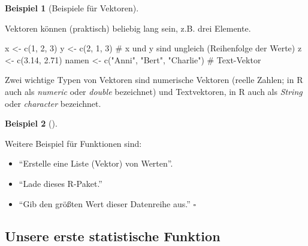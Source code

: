 \documentclass[
  letterpaper,
  twoside,
  open=any]{scrbook}
\newenvironment{Shaded}{\begin{snugshade}}{\end{snugshade}}
\newcommand{\CommentTok}[1]{\textcolor[rgb]{0.37,0.37,0.37}{#1}}
\newcommand{\DecValTok}[1]{\textcolor[rgb]{0.68,0.00,0.00}{#1}}
\newcommand{\FloatTok}[1]{\textcolor[rgb]{0.68,0.00,0.00}{#1}}
\newcommand{\FunctionTok}[1]{\textcolor[rgb]{0.28,0.35,0.67}{#1}}
\newcommand{\NormalTok}[1]{\textcolor[rgb]{0.00,0.23,0.31}{#1}}
\newcommand{\OtherTok}[1]{\textcolor[rgb]{0.00,0.23,0.31}{#1}}
\newcommand{\StringTok}[1]{\textcolor[rgb]{0.13,0.47,0.30}{#1}}
\providecommand{\tightlist}{%
  \setlength{\itemsep}{0pt}\setlength{\parskip}{0pt}}\usepackage{longtable,booktabs,array}
\theoremstyle{definition}
\theoremstyle{definition}
\newtheorem{example}{Beispiel}[chapter]
\theoremstyle{definition}
\theoremstyle{remark}
\begin{document}
\begin{example}[Beispiele für
Vektoren]\protect\hypertarget{exm-vektoren}{}\label{exm-vektoren}

Vektoren können (praktisch) beliebig lang sein, z.B. drei Elemente.

\begin{Shaded}
\begin{Highlighting}[]
\NormalTok{x }\OtherTok{\textless{}{-}} \FunctionTok{c}\NormalTok{(}\DecValTok{1}\NormalTok{, }\DecValTok{2}\NormalTok{, }\DecValTok{3}\NormalTok{)}
\NormalTok{y }\OtherTok{\textless{}{-}} \FunctionTok{c}\NormalTok{(}\DecValTok{2}\NormalTok{, }\DecValTok{1}\NormalTok{, }\DecValTok{3}\NormalTok{)  }\CommentTok{\# x und y sind ungleich (Reihenfolge der Werte)}
\NormalTok{z }\OtherTok{\textless{}{-}} \FunctionTok{c}\NormalTok{(}\FloatTok{3.14}\NormalTok{, }\FloatTok{2.71}\NormalTok{)  }
\NormalTok{namen }\OtherTok{\textless{}{-}} \FunctionTok{c}\NormalTok{(}\StringTok{"Anni"}\NormalTok{, }\StringTok{"Bert"}\NormalTok{, }\StringTok{"Charlie"}\NormalTok{) }\CommentTok{\# Text{-}Vektor}
\end{Highlighting}
\end{Shaded}

\end{example}

Zwei wichtige Typen von Vektoren sind numerische Vektoren (reelle
Zahlen; in R auch als \emph{numeric} oder \emph{double} bezeichnet) und
Textvektoren, in R auch als \emph{String} oder \emph{character}
bezeichnet.

\begin{example}[]\protect\hypertarget{exm-funs}{}\label{exm-funs}

Weitere Beispiel für Funktionen sind:

\begin{itemize}
\tightlist
\item
  \enquote{Erstelle eine Liste (Vektor) von Werten}.
\item
  \enquote{Lade dieses R-Paket.}
\item
  \enquote{Gib den größten Wert dieser Datenreihe aus.} \(\square\)
\end{itemize}

\end{example}

\subsection{Unsere erste statistische Funktion}\label{sec-first-fun}
\end{document}
